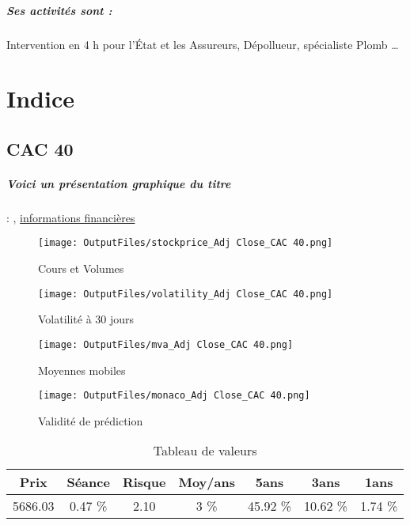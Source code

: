 \documentclass[11pt,a4paper]{report}%
\begin{document}
\paragraph{Ses activités sont : } Intervention en 4 h pour l’État et les Assureurs, Dépollueur, spécialiste Plomb … 
    
    \newpage\chapter{Indice}


\section{CAC 40}

\paragraph{Voici un présentation graphique du titre} : , \href{https://www.qwant.com/?q=site:https:%2f%2fwww.easybourse.com%2faction-societe%2fCAC-40&t=web&client=ext-firefox-hp}{informations financières}
\begin{figure}[!htb]
   \begin{minipage}{0.5\textwidth}
     \centering
     \texttt{[image: OutputFiles/stockprice\_Adj Close\_CAC 40.png]}
     \caption{Cours et Volumes}\label{Fig:price_CAC 40}
   \end{minipage}\hfill
   \begin{minipage}{0.5\textwidth}
     \centering
     \texttt{[image: OutputFiles/volatility\_Adj Close\_CAC 40.png]}
     \caption{Volatilité à 30 jours}\label{Fig:volat_CAC 40}
   \end{minipage}
\end{figure}
\begin{figure}[!htb]
   \begin{minipage}{0.5\textwidth}
     \centering
     \texttt{[image: OutputFiles/mva\_Adj Close\_CAC 40.png]}
     \caption{Moyennes mobiles}\label{Fig:mva_CAC 40}
   \end{minipage}\hfill
   \begin{minipage}{0.5\textwidth}
     \centering
     \texttt{[image: OutputFiles/monaco\_Adj Close\_CAC 40.png]}
     \caption{Validité de prédiction}\label{Fig:prediction_CAC 40}
   \end{minipage}
\end{figure}

\begin{table}[H]
  \centering
    \begin{tabular}{|c|c|c|c|c|c|c|}
    \hline
    Prix & Séance & Risque  & Moy/ans & 5ans & 3ans & 1ans \\
    \hline
    5686.03 &    0.47 \%    & 2.10 & 3 \% & 45.92 \% & 10.62 \% & 1.74 \% \\
    \hline
    \end{tabular}%
        \label{tab:table_CAC 40}%
      \caption{Tableau de valeurs}
\end{table}%

\newpage
\end{document}
